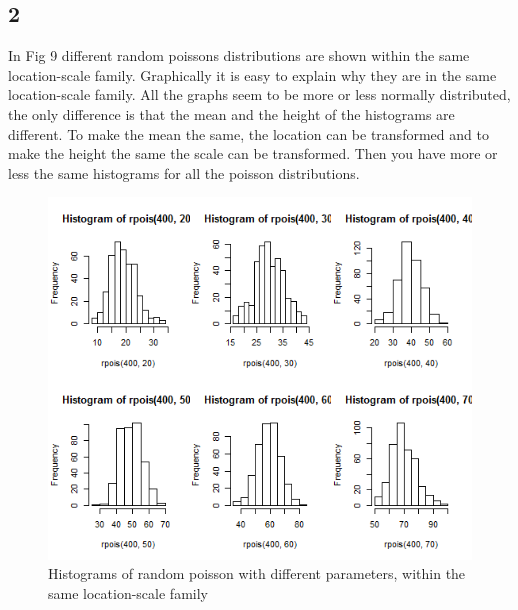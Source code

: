 \documentclass{article}
\begin{document}
    \subsection*{2}
      In Fig 9 different random poissons distributions are shown within the same location-scale family.
      Graphically it is easy to explain why they are in the same location-scale family.
      All the graphs seem to be more or less normally distributed,
      the only difference is that the mean and the height of the histograms are different.
      To make the mean the same, the location can be transformed and to make the height the same the scale can be transformed.
      Then you have more or less the same histograms for all the poisson distributions.
      \begin{figure}[H]
          \centering
          \includegraphics[scale=0.3]{../results/3_2.png}
          \caption{Histograms of random poisson with different parameters, within the same location-scale family}
          \label{fig:Hist3_2}
      \end{figure}
\end{document}
